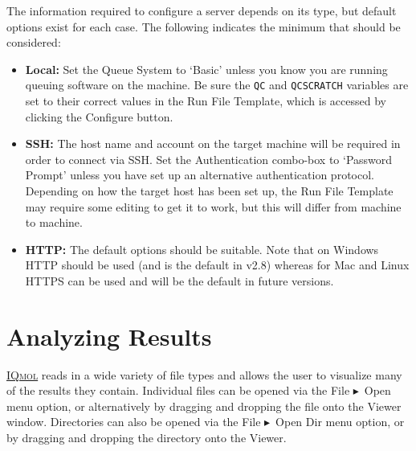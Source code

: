 \documentclass[a4paper,12pt]{article}
\newcommand{\iqmol}{\href{http://iqmol.org}{{\scshape IQmol}}}
\newcommand{\bt}{\ensuremath{\blacktriangleright}}
\begin{document}
The information required to configure a server depends on its type, but default
options exist for each case.  The following indicates the minimum that should
be considered:

\begin{itemize}
\item {\bf Local:} Set the Queue System to `Basic'
      unless you know you are running queuing software on the machine.
      Be sure the {\tt QC} and {\tt QCSCRATCH} variables are set to their correct
	  values in the Run File Template, which is accessed by clicking the Configure
      button.
\item {\bf SSH:} The host name and account on the target machine will 
      be required in order to connect via SSH.  Set the Authentication combo-box to
      `Password Prompt' unless you have set up an alternative authentication protocol.
	  Depending on how the target host has been set up, the Run File Template
	  may require some editing to get it to work, but this will differ from
      machine to machine.
\item {\bf HTTP:} The default options should be suitable.  Note that on Windows
	  HTTP should be used (and is the default in v2.8) whereas for Mac and
      Linux HTTPS can be used and will be the default in future versions.  
\end{itemize}


\newpage
\section{Analyzing Results}

\iqmol{} reads in a wide variety of file types and allows the user to visualize
many of the results they contain.  Individual files can be opened via the File
\bt\ Open menu option, or alternatively by dragging and dropping the file onto
the Viewer window.  Directories can also be opened via the File \bt\ Open Dir
menu option, or by dragging and dropping the directory onto the Viewer.  
\end{document}

